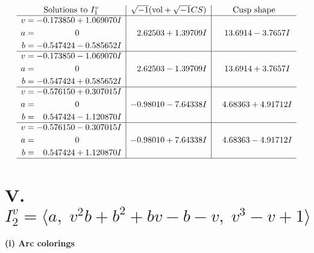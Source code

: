 \documentclass[1p]{elsarticle_modified}
\theoremstyle{definition}
\newcommand{\I}{\sqrt{-1}}
\begin{document}
$$\begin{array}{c|c|c}  
\text{Solutions to }I^v_{1}& \I (\text{vol} + \sqrt{-1}CS) & \text{Cusp shape}\\
 \hline 
\begin{aligned}
v &= -0.173850 + 1.069070 I \\
a &= \phantom{-0.000000 } 0 \\
b &= -0.547424 - 0.585652 I\end{aligned}
 & \phantom{-}2.62503 + 1.39709 I & \phantom{-}13.6914 - 3.7657 I \\ \hline\begin{aligned}
v &= -0.173850 - 1.069070 I \\
a &= \phantom{-0.000000 } 0 \\
b &= -0.547424 + 0.585652 I\end{aligned}
 & \phantom{-}2.62503 - 1.39709 I & \phantom{-}13.6914 + 3.7657 I \\ \hline\begin{aligned}
v &= -0.576150 + 0.307015 I \\
a &= \phantom{-0.000000 } 0 \\
b &= \phantom{-}0.547424 - 1.120870 I\end{aligned}
 & -0.98010 - 7.64338 I & \phantom{-}4.68363 + 4.91712 I \\ \hline\begin{aligned}
v &= -0.576150 - 0.307015 I \\
a &= \phantom{-0.000000 } 0 \\
b &= \phantom{-}0.547424 + 1.120870 I\end{aligned}
 & -0.98010 + 7.64338 I & \phantom{-}4.68363 - 4.91712 I\\
 \hline 
 \end{array}$$\newpage\newpage\renewcommand{\arraystretch}{1}
\centering \section*{V. $I^v_{2}= \langle a,\;v^2 b+b^2+b v- b- v,\;v^3- v+1 \rangle$}
\flushleft \textbf{(i) Arc colorings}\\
\end{document}
